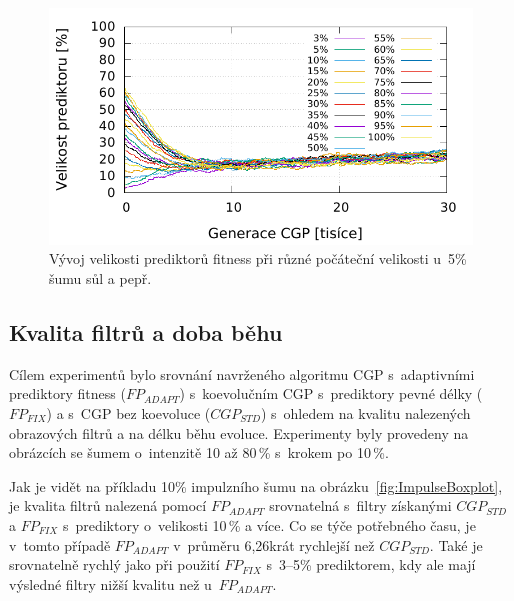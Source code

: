 \documentclass[czech]{ExcelAtFIT} %
\begin{document}

\begin{figure}[htb]
    \centering
    \includegraphics[width=0.9\linewidth]{images/initial-size-5-30kg.pdf}
    \caption{Vývoj velikosti prediktorů fitness při různé počáteční velikosti u~5\% šumu sůl a pepř.}
    \label{fig:InitialSize}
\end{figure}

\subsection{Kvalita filtrů a doba běhu}

Cílem experimentů bylo srovnání navrženého algoritmu CGP s~adaptivními prediktory fitness ($\mathit{FP_{ADAPT}}$) s~koevolučním CGP s~prediktory pevné délky ($\mathit{FP_{FIX}}$) a s~CGP bez koevoluce ($\mathit{CGP_{STD}}$) s~ohledem na kvalitu nalezených obrazových filtrů a na délku běhu evoluce. Experimenty byly provedeny na obrázcích se šumem o~intenzitě 10 až 80\,\% s~krokem po 10\,\%.

Jak je vidět na příkladu 10\% impulzního šumu na obrázku~\ref{fig:ImpulseBoxplot}, je kvalita filtrů nalezená pomocí $\mathit{FP_{ADAPT}}$ srovnatelná s~filtry získanými $\mathit{CGP_{STD}}$ a $\mathit{FP_{FIX}}$ s~pre\-dik\-tory o~velikosti 10\,\% a více. Co se týče potřebného času, je v~tomto případě $\mathit{FP_{ADAPT}}$ v~průměru 6,26krát rychlejší než $\mathit{CGP_{STD}}$. Také je srovnatelně rychlý jako při použití $\mathit{FP_{FIX}}$ s~3--5\% pre\-dik\-to\-rem, kdy ale mají výsledné filtry nižší kvalitu než u~$\mathit{FP_{ADAPT}}$.
\end{document}

